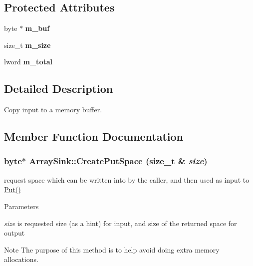 \subsection*{Protected Attributes}
\begin{DoxyCompactItemize}
\item 
\hypertarget{class_array_sink_abc61873fb8764a6b2c51e352b4723879}{
byte $\ast$ {\bfseries m\_\-buf}}
\label{class_array_sink_abc61873fb8764a6b2c51e352b4723879}

\item 
\hypertarget{class_array_sink_a41c64d23b476b2a1cfb2b0b30c0e8c80}{
size\_\-t {\bfseries m\_\-size}}
\label{class_array_sink_a41c64d23b476b2a1cfb2b0b30c0e8c80}

\item 
\hypertarget{class_array_sink_ab72ea9d4d82758339fcbca763d814b11}{
lword {\bfseries m\_\-total}}
\label{class_array_sink_ab72ea9d4d82758339fcbca763d814b11}

\end{DoxyCompactItemize}


\subsection{Detailed Description}
Copy input to a memory buffer. 

\subsection{Member Function Documentation}
\hypertarget{class_array_sink_a10b95ee17a2b7763757b021de0172f5f}{
\subsubsection[{CreatePutSpace}]{\setlength{\rightskip}{0pt plus 5cm}byte$\ast$ ArraySink::CreatePutSpace (size\_\-t \& {\em size})}}
\label{class_array_sink_a10b95ee17a2b7763757b021de0172f5f}


request space which can be written into by the caller, and then used as input to \hyperlink{class_buffered_transformation_ae70658b0d271f8e114ac6c3cc9774ede}{Put()} 
\begin{DoxyParams}{Parameters}
\item[{\em size}]is requested size (as a hint) for input, and size of the returned space for output\end{DoxyParams}
\begin{DoxyNote}{Note}
The purpose of this method is to help avoid doing extra memory allocations. 
\end{DoxyNote}


